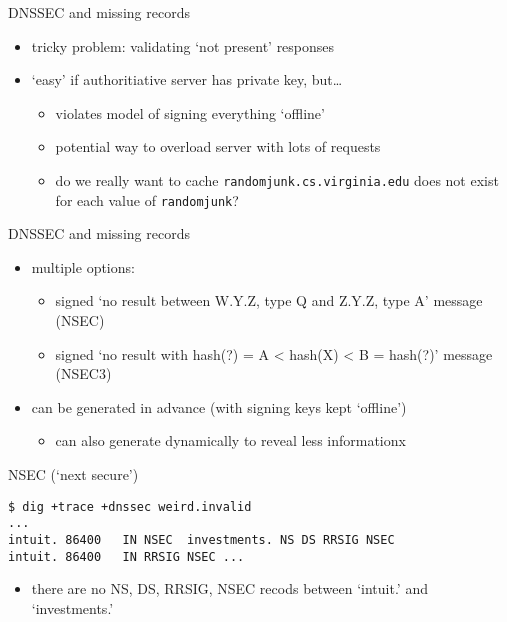 
\begin{frame}{DNSSEC and missing records}
    \begin{itemize}
    \item tricky problem: validating `not present' responses
    \vspace{.5cm}
    \item `easy' if authoritiative server has private key, but\ldots
        \begin{itemize}
        \item violates model of signing everything `offline'
        \item potential way to overload server with lots of requests
        \item do we really want to cache \texttt{randomjunk.cs.virginia.edu} does not exist for each value of \texttt{randomjunk}?
        \end{itemize}
    \end{itemize}
\end{frame}

\begin{frame}{DNSSEC and missing records}
    \begin{itemize}
    \item multiple options:
        \begin{itemize}
        \item signed `no result between W.Y.Z, type Q and Z.Y.Z, type A' message (NSEC)
        \item signed `no result with hash(?) = A < hash(X) < B = hash(?)' message (NSEC3)
        \end{itemize}
    \item can be generated in advance  (with signing keys kept `offline')
        \begin{itemize}
        \item can also generate dynamically to reveal less informationx
        \end{itemize}
    \end{itemize}
\end{frame}

\begin{frame}[fragile]{NSEC (`next secure')}
\begin{Verbatim}[fontsize=\fontsize{9}{10}]
$ dig +trace +dnssec weird.invalid
...
intuit. 86400   IN NSEC  investments. NS DS RRSIG NSEC
intuit. 86400   IN RRSIG NSEC ...
\end{Verbatim}
\begin{itemize}
\item there are no NS, DS, RRSIG, NSEC recods between `intuit.' and `investments.'
\end{itemize}
\end{frame}

